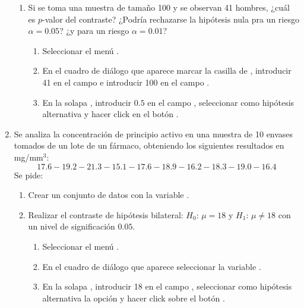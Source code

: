 \begin{enumerate}[leftmargin=*]
\begin{enumerate}
\item Si se toma una muestra de tamaño 100 y se observan 41 hombres, ¿cuál es $p$-valor del contraste? 
¿Podría rechazarse la hipótesis nula pra un riesgo $\alpha=0.05$? 
¿y para un riesgo $\alpha=0.01$?
\begin{indicacion}
\begin{enumerate}
\item Seleccionar el menú .
\item En el cuadro de diálogo que aparece marcar la casilla de , introducir
41 en el campo  e introducir 100 en el campo .
\item En la solapa , introducir $0.5$ en el campo , seleccionar
como hipótesis alternativa  y hacer click en el botón .
\end{enumerate}
\end{indicacion}
\end{enumerate}


\item  Se analiza la concentración de principio activo en una muestra de 10 envases tomados de un lote de un fármaco, obteniendo los
siguientes resultados en mg/mm$^{3}$: 
\[ 
17.6-19.2-21.3-15.1-17.6-18.9-16.2-18.3-19.0-16.4 
\]
Se pide:
\begin{enumerate}
\item Crear un conjunto de datos con la variable .

\item Realizar el contraste de hipótesis bilateral: $H_0$: $\mu=18$ y $H_1$: $\mu\neq18$ con un nivel de significación
$0.05$.
\begin{indicacion}
\begin{enumerate}
\item Seleccionar el menú .
\item En el cuadro de diálogo que aparece seleccionar la variable .
\item En la solapa , introducir 18 en el campo , seleccionar como
hipótesis alternativa la opción  y hacer click sobre el botón .
\end{enumerate}
\end{indicacion}


\end{enumerate}
\end{enumerate}
